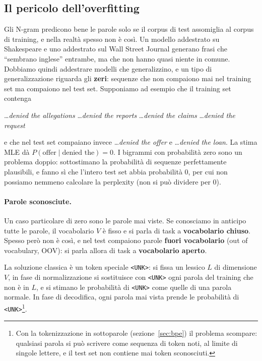 \subsection{Il pericolo dell'overfitting}
Gli N-gram predicono bene le parole solo se il corpus di test assomiglia al corpus di training, e nella realtà spesso non è così. Un modello addestrato su Shakespeare e uno addestrato sul Wall Street Journal generano frasi che \enquote{sembrano inglese} entrambe, ma che non hanno quasi niente in comune. Dobbiamo quindi addestrare modelli che generalizzino, e un tipo di generalizzazione riguarda gli \textbf{zeri}: sequenze che non compaiono mai nel training set ma compaiono nel test set. Supponiamo ad esempio che il training set contenga
\begin{center}
\dots \textit{denied the allegations} \qquad \dots \textit{denied the reports} \qquad \dots \textit{denied the claims} \qquad \dots \textit{denied the request}
\end{center}
e che nel test set compaiano invece \dots \textit{denied the offer} e \dots \textit{denied the loan}. La stima MLE dà $P(\text{offer} \mid \text{denied the}) = 0$. I bigrammi con probabilità zero sono un problema doppio: sottostimano la probabilità di sequenze perfettamente plausibili, e fanno sì che l'intero test set abbia probabilità 0, per cui non possiamo nemmeno calcolare la perplexity (non si può dividere per 0).

\paragraph{Parole sconosciute.} Un caso particolare di zero sono le parole mai viste. Se conosciamo in anticipo tutte le parole, il vocabolario $V$ è fisso e si parla di task a \textbf{vocabolario chiuso}. Spesso però non è così, e nel test compaiono parole \textbf{fuori vocabolario} (out of vocabulary, OOV): si parla allora di task a \textbf{vocabolario aperto}.

La soluzione classica è un token speciale \texttt{<UNK>}: si fissa un lessico $L$ di dimensione $V$, in fase di normalizzazione si sostituisce con \texttt{<UNK>} ogni parola del training che non è in $L$, e si stimano le probabilità di \texttt{<UNK>} come quelle di una parola normale. In fase di decodifica, ogni parola mai vista prende le probabilità di \texttt{<UNK>}\footnote{Con la tokenizzazione in sottoparole (sezione~\ref{sec:bpe}) il problema scompare: qualsiasi parola si può scrivere come sequenza di token noti, al limite di singole lettere, e il test set non contiene mai token sconosciuti.}.

